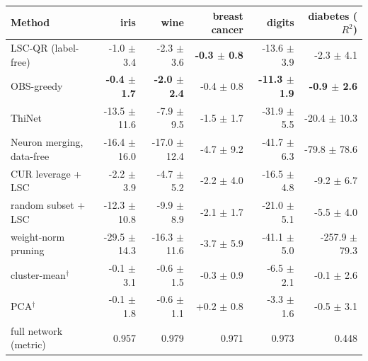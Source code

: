 \begin{tabular}{lrrrrr}\toprule
Method & iris & wine & breast cancer & digits & diabetes ($R^2$)\\\midrule
LSC-QR (label-free) & -1.0 $\pm$ 3.4 & -2.3 $\pm$ 3.6 & \textbf{-0.3 $\pm$ 0.8} & -13.6 $\pm$ 3.9 & -2.3 $\pm$ 4.1\\
OBS-greedy \cite{hassibi1993,dong2017} & \textbf{-0.4 $\pm$ 1.7} & \textbf{-2.0 $\pm$ 2.4} & -0.4 $\pm$ 0.8 & \textbf{-11.3 $\pm$ 1.9} & \textbf{-0.9 $\pm$ 2.6}\\
ThiNet \cite{luo2017} & -13.5 $\pm$ 11.6 & -7.9 $\pm$ 9.5 & -1.5 $\pm$ 1.7 & -31.9 $\pm$ 5.5 & -20.4 $\pm$ 10.3\\
Neuron merging, data-free \cite{srinivas2015,kim2020} & -16.4 $\pm$ 16.0 & -17.0 $\pm$ 12.4 & -4.7 $\pm$ 9.2 & -41.7 $\pm$ 6.3 & -79.8 $\pm$ 78.6\\
CUR leverage + LSC \cite{mahoney2009} & -2.2 $\pm$ 3.9 & -4.7 $\pm$ 5.2 & -2.2 $\pm$ 4.0 & -16.5 $\pm$ 4.8 & -9.2 $\pm$ 6.7\\
random subset + LSC & -12.3 $\pm$ 10.8 & -9.9 $\pm$ 8.9 & -2.1 $\pm$ 1.7 & -21.0 $\pm$ 5.1 & -5.5 $\pm$ 4.0\\
weight-norm pruning \cite{han2015} & -29.5 $\pm$ 14.3 & -16.3 $\pm$ 11.6 & -3.7 $\pm$ 5.9 & -41.1 $\pm$ 5.0 & -257.9 $\pm$ 79.3\\
cluster-mean$^\dagger$ & -0.1 $\pm$ 3.1 & -0.6 $\pm$ 1.5 & -0.3 $\pm$ 0.9 & -6.5 $\pm$ 2.1 & -0.1 $\pm$ 2.6\\
PCA$^\dagger$ & -0.1 $\pm$ 1.8 & -0.6 $\pm$ 1.1 & +0.2 $\pm$ 0.8 & -3.3 $\pm$ 1.6 & -0.5 $\pm$ 3.1\\
\midrule
full network (metric) & 0.957 & 0.979 & 0.971 & 0.973 & 0.448\\
\bottomrule\end{tabular}
